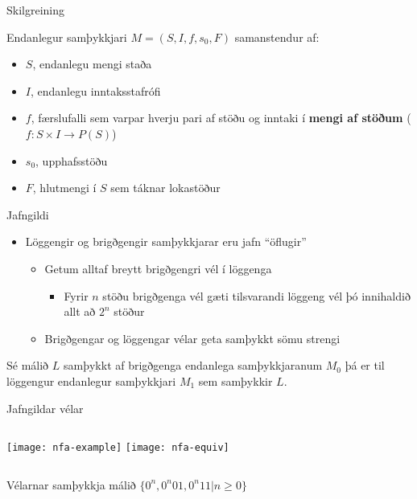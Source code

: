 \documentclass[handout]{beamer}
\begin{document}
\begin{frame}{Skilgreining}
    \begin{tcolorbox}[title=Brigðgengur samþykkjari]
        Endanlegur samþykkjari $M = (S, I , f, s_0, F)$ samanstendur af:
        \begin{itemize}
         \item $S$, endanlegu mengi staða
         \item $I$, endanlegu inntaksstafrófi
         \item $f$, færslufalli sem varpar hverju pari af stöðu og inntaki í \textbf{mengi af stöðum} ($f: S \times I \to P(S)$)
         \item $s_0$, upphafsstöðu
         \item $F$, hlutmengi í $S$ sem táknar lokastöður
        \end{itemize}
    \end{tcolorbox}
\end{frame}

\begin{frame}{Jafngildi}
    \begin{itemize}
        \item Löggengir og brigðgengir samþykkjarar eru jafn ``öflugir''
        \begin{itemize}
            \item Getum alltaf breytt brigðgengri vél í löggenga
            \begin{itemize}
                \item Fyrir $n$ stöðu brigðgenga vél gæti tilsvarandi löggeng vél þó innihaldið allt að $2^n$ stöður
            \end{itemize}
            \item Brigðgengar og löggengar vélar geta samþykkt sömu strengi
        \end{itemize}
    \end{itemize}
    \begin{tcolorbox}
        Sé málið $L$ samþykkt af brigðgenga endanlega samþykkjaranum $M_0$ þá er til löggengur endanlegur samþykkjari $M_1$ sem samþykkir $L$.
    \end{tcolorbox}
\end{frame}

\begin{frame}{Jafngildar vélar}
    \begin{columns}
        \texttt{[image: nfa-example]}
        \pause
        \texttt{[image: nfa-equiv]}
    \end{columns}
    \pause
    \begin{center}
        Vélarnar samþykkja málið $\{0^n, 0^n01, 0^n11| n \geq 0\}$
    \end{center}
\end{frame}
\end{document}
